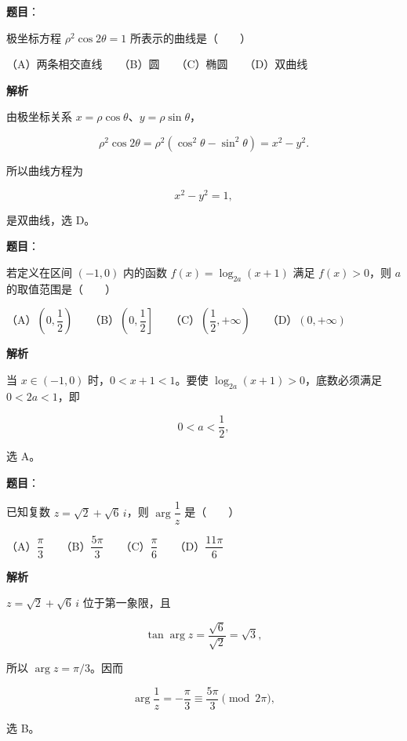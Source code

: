 \begin{answer}

\textbf{题目}：

极坐标方程 $\rho^2\cos2\theta=1$ 所表示的曲线是\mbox{（　　）}

（A）两条相交直线　　（B）圆　　（C）椭圆　　（D）双曲线

\textbf{解析}

由极坐标关系 $x=\rho\cos\theta$、$y=\rho\sin\theta$，

\nopagebreak[4]
\[
\rho^2\cos2\theta
=\rho^2(\cos^2\theta-\sin^2\theta)
=x^2-y^2.
\]

所以曲线方程为

\nopagebreak[4]
\[
x^2-y^2=1,
\]

是双曲线，选 D。


\end{answer}
\begin{answer}

\textbf{题目}：

若定义在区间 $(-1,0)$ 内的函数 $f(x)=\log_{2a}(x+1)$ 满足 $f(x)>0$，则 $a$ 的取值范围是\mbox{（　　）}

（A）$\left(0,\dfrac12\right)$　　（B）$\left(0,\dfrac12\right]$　　（C）$\left(\dfrac12,+\infty\right)$　　（D）$(0,+\infty)$

\textbf{解析}

当 $x\in(-1,0)$ 时，$0<x+1<1$。要使 $\log_{2a}(x+1)>0$，底数必须满足 $0<2a<1$，即

\nopagebreak[4]
\[
0<a<\frac12,
\]

选 A。


\end{answer}
\begin{answer}

\textbf{题目}：

已知复数 $z=\sqrt2+\sqrt6\,i$，则 $\arg\dfrac1z$ 是\mbox{（　　）}

（A）$\dfrac\pi3$　　（B）$\dfrac{5\pi}3$　　（C）$\dfrac\pi6$　　（D）$\dfrac{11\pi}6$

\textbf{解析}

$z=\sqrt2+\sqrt6\,i$ 位于第一象限，且

\nopagebreak[4]
\[
\tan\arg z=\frac{\sqrt6}{\sqrt2}=\sqrt3,
\]

所以 $\arg z=\pi/3$。因而

\nopagebreak[4]
\[
\arg\frac1z=-\frac\pi3\equiv\frac{5\pi}{3}\pmod{2\pi},
\]

选 B。


\end{answer}
